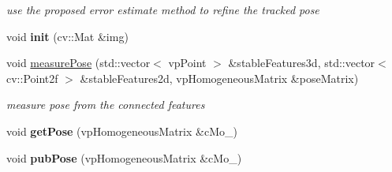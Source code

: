 \begin{DoxyCompactItemize}
\begin{DoxyCompactList}\small\item\em use the proposed error estimate method to refine the tracked pose \end{DoxyCompactList}\item 
\hypertarget{classkltFbTracker_abb7ffa568c30b0f5760fa567abe69505}{void {\bfseries init} (cv\-::\-Mat \&img)}\label{classkltFbTracker_abb7ffa568c30b0f5760fa567abe69505}

\item 
void \hyperlink{classkltFbTracker_adcddd61877b534e1c03099e18ce61468}{measure\-Pose} (std\-::vector$<$ vp\-Point $>$ \&stable\-Features3d, std\-::vector$<$ cv\-::\-Point2f $>$ \&stable\-Features2d, vp\-Homogeneous\-Matrix \&pose\-Matrix)
\begin{DoxyCompactList}\small\item\em measure pose from the connected features \end{DoxyCompactList}\item 
\hypertarget{classkltFbTracker_a69db4ec71868931e9903ef2011d6608b}{void {\bfseries get\-Pose} (vp\-Homogeneous\-Matrix \&c\-Mo\-\_\-)}\label{classkltFbTracker_a69db4ec71868931e9903ef2011d6608b}

\item 
\hypertarget{classkltFbTracker_a7dee57403e06ddbea9ab2e5129b74c3c}{void {\bfseries pub\-Pose} (vp\-Homogeneous\-Matrix \&c\-Mo\-\_\-)}\label{classkltFbTracker_a7dee57403e06ddbea9ab2e5129b74c3c}

\end{DoxyCompactItemize}
